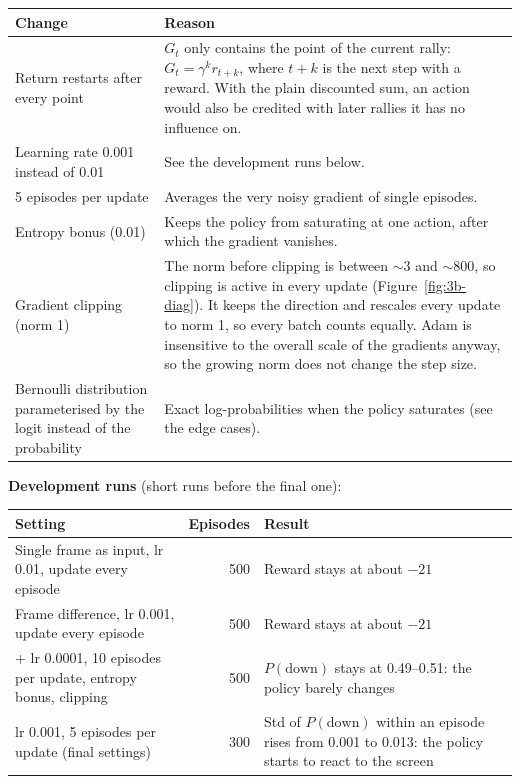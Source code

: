 \begin{center}
\small
\begin{tabularx}{\textwidth}{@{}p{3.9cm}L@{}}
  \toprule
  \textbf{Change} & \textbf{Reason} \\
  \midrule
  Return restarts after every point & $G_t$ only contains the point of the current rally: $G_t = \gamma^{k} r_{t+k}$, where $t + k$ is the next step with a reward. With the plain discounted sum, an action would also be credited with later rallies it has no influence on. \\
  Learning rate 0.001 instead of 0.01 & See the development runs below. \\
  5 episodes per update & Averages the very noisy gradient of single episodes. \\
  Entropy bonus (0.01) & Keeps the policy from saturating at one action, after which the gradient vanishes. \\
  Gradient clipping (norm 1) & The norm before clipping is between $\sim$3 and $\sim$800, so clipping is active in every update (Figure~\ref{fig:3b-diag}). It keeps the direction and rescales every update to norm 1, so every batch counts equally. Adam is insensitive to the overall scale of the gradients anyway, so the growing norm does not change the step size. \\
  Bernoulli distribution parameterised by the logit instead of the probability & Exact log-probabilities when the policy saturates (see the edge cases). \\
  \bottomrule
\end{tabularx}
\end{center}

\textbf{Development runs} (short runs before the final one):

\begin{center}
\small
\begin{tabularx}{\textwidth}{@{}Lrl@{}}
  \toprule
  \textbf{Setting} & \textbf{Episodes} & \textbf{Result} \\
  \midrule
  Single frame as input, lr 0.01, update every episode & 500 & Reward stays at about $-21$ \\
  Frame difference, lr 0.001, update every episode & 500 & Reward stays at about $-21$ \\
  + lr 0.0001, 10 episodes per update, entropy bonus, clipping & 500 & \parbox[t]{5.2cm}{$P(\text{down})$ stays at 0.49--0.51: the policy barely changes} \\
  lr 0.001, 5 episodes per update (final settings) & 300 & \parbox[t]{5.2cm}{Std of $P(\text{down})$ within an episode rises from 0.001 to 0.013: the policy starts to react to the screen} \\
  \bottomrule
\end{tabularx}
\end{center}

